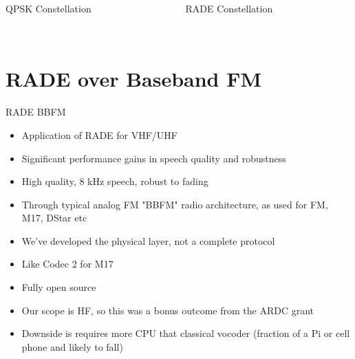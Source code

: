 \documentclass{beamer}
\begin{document}
\begin{frame}

\begin{columns}
\begin{column}{0.5\textwidth}
  \begin{center}
  QPSK Constellation \\~\\
  \end{center}
\end{column}
\begin{column}{0.5\textwidth}  %
  \begin{center}
  RADE Constellation \\~\\
  \end{center}
\end{column}
\end{columns}

\end{frame}

\section{RADE over Baseband FM}
\begin{frame}{RADE BBFM}
\begin{itemize}
\item Application of RADE for VHF/UHF
\item Significant performance gains in speech quality and robustness
\item High quality, 8 kHz speech, robust to fading
\item Through typical analog FM "BBFM" radio architecture, as used for FM, M17, DStar etc
\item We've developed the physical layer, not a complete protocol
\item Like Codec 2 for M17
\item Fully open source
\item Our scope is HF, so this was a bonus outcome from the ARDC grant
\item Downside is requires more CPU that classical vocoder (fraction of a Pi or cell phone and likely to fall)
\end{itemize}
\end{frame}
\end{document}
